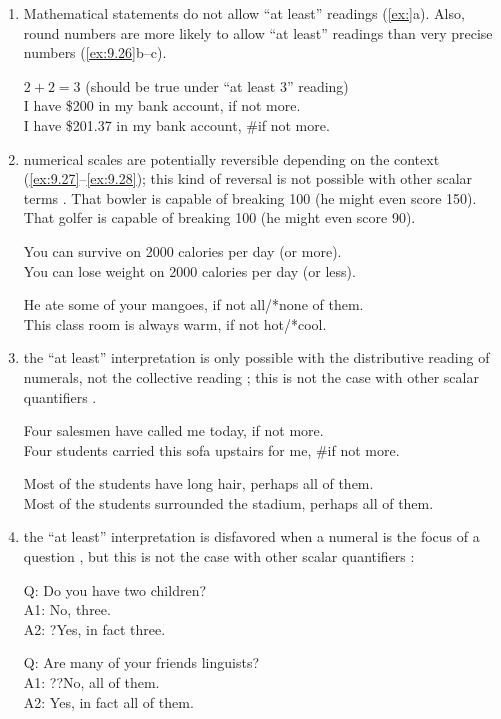 \begin{enumerate}
\item Mathematical statements do not allow “at least” readings (\ref{ex:}a). Also, round numbers are more likely to allow “at least” readings than very precise numbers (\ref{ex:9.26}b--c).

\ea \label{ex:9.26}
\ea * $2+2=3$ (should be true under “at least 3” reading)\\
\ex I have \$200 in my bank account, if not more.\\
\ex I have \$201.37 in my bank account, \#if not more.
                       \z
\z
 
\item numerical scales are potentially reversible depending on the context (\ref{ex:9.27}--\ref{ex:9.28}); this kind of reversal is not possible with other scalar terms .
\ea \label{ex:9.27}
\ea That bowler is capable of breaking 100 (he might even score 150).\\
\ex That golfer is capable of breaking 100 (he might even score 90).
                       \z
\z

\ea \label{ex:9.28}
\ea You can survive on 2000 calories per day (or more).\\
\ex You can lose weight on 2000 calories per day (or less).
                       \z
\z

\ea \label{ex:9.29}
\ea He ate some of your mangoes, if not all/*none of them.\\
\ex This class room is always warm, if not hot/*cool.
                       \z
\z

\item the “at least” interpretation is only possible with the distributive reading of numerals, not the collective reading ; this is not the case with other scalar quantifiers .

\ea \label{ex:9.30}
\ea Four salesmen have called me today, if not more.\\
\ex Four students carried this sofa upstairs for me, \#if not more.
                       \z
\z

\ea \label{ex:9.31}
\ea Most of the students have long hair, perhaps all of them.\\
\ex Most of the students surrounded the stadium, perhaps all of them.
                       \z
\z

\item the “at least” interpretation is disfavored when a numeral is the focus of a question , but this is not the case with other scalar quantifiers :

\ea
Q: Do you have two children?\\
A1: No, three.\\
A2: ?Yes, in fact three.
\z

\ea
Q: Are many of your friends linguists?\\
A1: ??No, all of them.\\
A2: Yes, in fact all of them.
\z
\end{enumerate}


